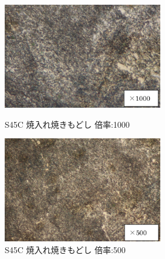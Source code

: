 \documentclass[10pt，a4j]{jsarticle}
\begin{document}
  \begin{figure}[htbp]
    \begin{minipage}{0.5\hsize}
      \begin{center}
        \includegraphics[width=7cm]{../img/S45C_yakiiremodoshi_1000.png}
        \caption{S45C 焼入れ焼きもどし 倍率:1000}
      \end{center}
    \end{minipage}
    \begin{minipage}{0.5\hsize}
      \begin{center}
        \includegraphics[width=7cm]{../img/S45C_yakiiremodoshi_500.png}
        \caption{S45C 焼入れ焼きもどし 倍率:500}
      \end{center}
    \end{minipage}
  \end{figure}
\end{document}
